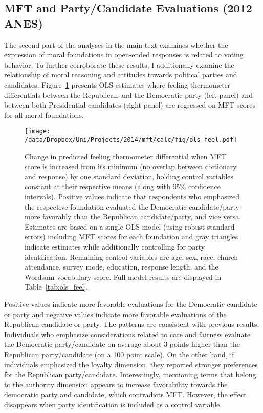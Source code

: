 \clearpage
\subsection{MFT and Party/Candidate Evaluations (2012 ANES)}

The second part of the analyses in the main text examines whether the expression of moral foundations in open-ended responses is related to voting behavior. To further corroborate these results, I additionally examine the relationship of moral reasoning and attitudes towards political parties and candidates. Figure~\ref{fig:ols_feel} presents OLS estimates where feeling thermometer differentials between the Republican and the Democratic party (left panel) and between both Presidential candidates (right panel) are regressed on MFT scores for all moral foundations. 


\begin{figure}[ht]\centering
\texttt{[image: /data/Dropbox/Uni/Projects/2014/mft/calc/fig/ols\_feel.pdf]}
\caption[Effect of MFT score on predicted feeling thermometer differential]{Change in predicted feeling thermometer differential when MFT score is increased from its minimum (no overlap between dictionary and response) by one standard deviation, holding control variables constant at their respective means (along with 95\% confidence intervals). Positive values indicate that respondents who emphasized the respective foundation evaluated the Democratic candidate/party more favorably than the Republican candidate/party, and vice versa. Estimates are based on a single OLS model (using robust standard errors) including MFT scores for each foundation and gray triangles indicate estimates while additionally controlling for party identification. Remaining control variables are age, sex, race, church attendance, survey mode, education, response length, and the Wordsum vocabulary score. Full model results are displayed in Table~\ref{tab:ols_feel}.
}\label{fig:ols_feel}
\end{figure}

Positive values indicate more favorable evaluations for the Democratic candidate or party and negative values indicate more favorable evaluations of the Republican candidate or party. The patterns are consistent with previous results. Individuals who emphasize considerations related to care and fairness evaluate the Democratic party/candidate on average about 3 points higher than the Republican party/candidate (on a 100 point scale). On the other hand, if individuals emphasized the loyalty dimension, they reported stronger preferences for the Republican party/candidate. Interestingly, mentioning terms that belong to the authority dimension appears to increase favorability towards the democratic party and candidate, which contradicts MFT. However, the effect disappears when party identification is included as a control variable.


